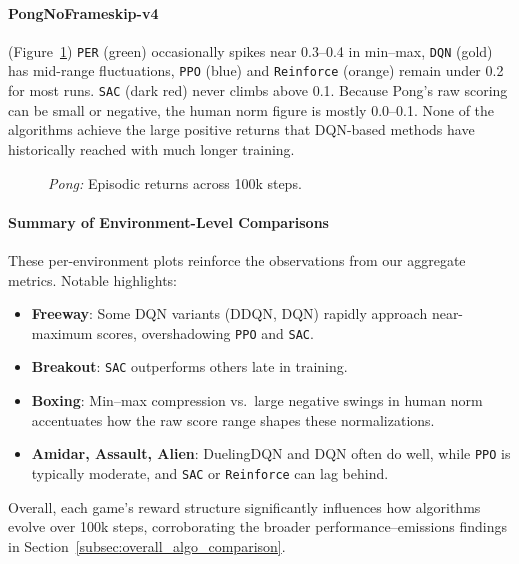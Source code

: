 \paragraph{PongNoFrameskip-v4}
(Figure~\ref{fig:pong_comparison_combined})
\texttt{PER} (green) occasionally spikes near 0.3--0.4 in min--max, 
\texttt{DQN} (gold) has mid-range fluctuations, 
\texttt{PPO} (blue) and \texttt{Reinforce} (orange) remain under 0.2 for most runs. 
\texttt{SAC} (dark red) never climbs above 0.1. 
Because Pong's raw scoring can be small or negative, 
the human norm figure is mostly 0.0--0.1. None of the algorithms achieve 
the large positive returns that DQN-based methods have historically 
reached with much longer training.

\begin{figure} 
	\centering
	\quad
	\caption{\emph{Pong:} Episodic returns across 100k steps.}
	\label{fig:pong_comparison_combined}
\end{figure}

\paragraph{Summary of Environment-Level Comparisons}
These per-environment plots reinforce the observations from our aggregate metrics.
Notable highlights:
\begin{itemize}
	\item \textbf{Freeway}: Some DQN variants (DDQN, DQN) rapidly approach near-maximum 
	scores, overshadowing \texttt{PPO} and \texttt{SAC}.
	\item \textbf{Breakout}: \texttt{SAC} outperforms others late in training.
	\item \textbf{Boxing}: Min--max compression vs.\ large negative swings in human norm 
	accentuates how the raw score range shapes these normalizations.
	\item \textbf{Amidar, Assault, Alien}: DuelingDQN and DQN often do well, 
	while \texttt{PPO} is typically moderate, and \texttt{SAC} or \texttt{Reinforce} 
	can lag behind.
\end{itemize}
Overall, each game's reward structure significantly influences how algorithms evolve 
over 100k steps, corroborating the broader performance–emissions findings in 
Section~\ref{subsec:overall_algo_comparison}.

